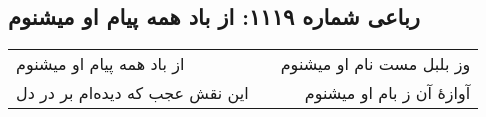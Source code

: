 \begin{center}
\section*{رباعی شماره ۱۱۱۹: از باد همه پیام او میشنوم}
\label{sec:1119}
\begin{longtable}{l p{0.5cm} r}
از باد همه پیام او میشنوم
&&
وز بلبل مست نام او میشنوم
\\
این نقش عجب که دیده‌ام بر در دل
&&
آوازهٔ آن ز بام او میشنوم
\\
\end{longtable}
\end{center}
